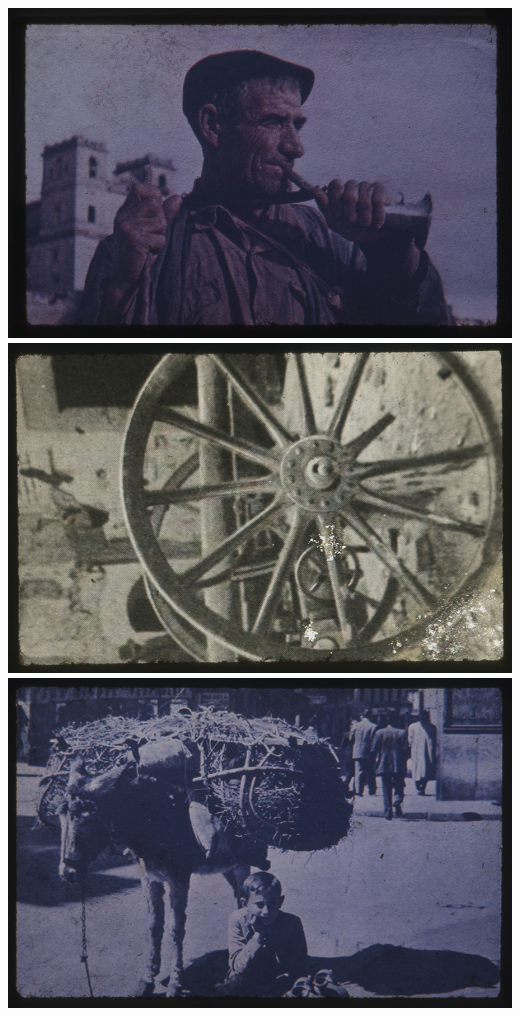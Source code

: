 \includegraphics[width=\columnwidth]{media/IMAGEM26.jpg}
\includegraphics[width=\columnwidth]{media/IMAGEM27.jpg}
\includegraphics[width=\columnwidth]{media/IMAGEM28.jpg}
